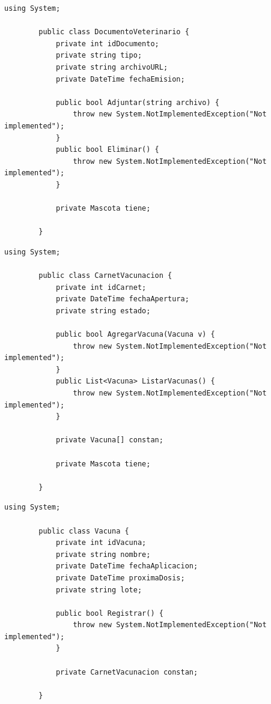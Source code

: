 \documentclass[journal,onecolumn]{IEEEtran}
\begin{document}
	\begin{lstlisting}[caption={Clase \texttt{DocumentoVeterinario}.}, label={lst:documentoveterinario}]
		using System;
		
		public class DocumentoVeterinario {
			private int idDocumento;
			private string tipo;
			private string archivoURL;
			private DateTime fechaEmision;
			
			public bool Adjuntar(string archivo) {
				throw new System.NotImplementedException("Not implemented");
			}
			public bool Eliminar() {
				throw new System.NotImplementedException("Not implemented");
			}
			
			private Mascota tiene;
			
		}
	\end{lstlisting}
	
	\begin{lstlisting}[caption={Clase \texttt{CarnetVacunacion}.}, label={lst:carnetvacunacion}]
		using System;
		
		public class CarnetVacunacion {
			private int idCarnet;
			private DateTime fechaApertura;
			private string estado;
			
			public bool AgregarVacuna(Vacuna v) {
				throw new System.NotImplementedException("Not implemented");
			}
			public List<Vacuna> ListarVacunas() {
				throw new System.NotImplementedException("Not implemented");
			}
			
			private Vacuna[] constan;
			
			private Mascota tiene;
			
		}
	\end{lstlisting}
	
	\newpage
	
	\begin{lstlisting}[caption={Clase \texttt{Vacuna}.}, label={lst:vacuna}]
		using System;
		
		public class Vacuna {
			private int idVacuna;
			private string nombre;
			private DateTime fechaAplicacion;
			private DateTime proximaDosis;
			private string lote;
			
			public bool Registrar() {
				throw new System.NotImplementedException("Not implemented");
			}
			
			private CarnetVacunacion constan;
			
		}
	\end{lstlisting}
	
\end{document}
